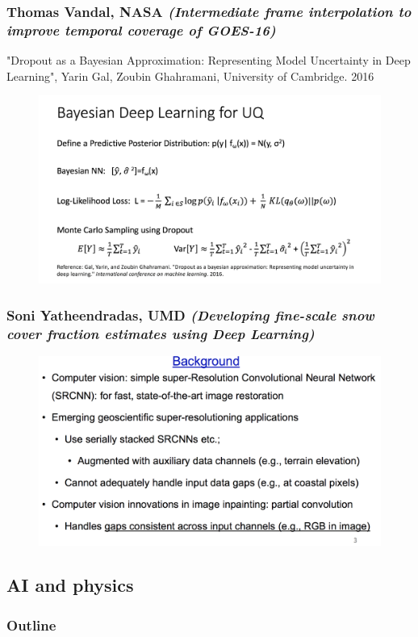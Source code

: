 \documentclass{beamer}
\begin{document}
\begin{frame}
\frametitle{Thomas Vandal, NASA \textit{(Intermediate frame interpolation to improve temporal coverage of GOES-16)}}
"Dropout as a Bayesian Approximation:
Representing Model Uncertainty in Deep Learning", Yarin Gal, Zoubin Ghahramani, University of Cambridge. 2016

\begin{figure}
	\includegraphics[width=.8\linewidth]{figs/ScreenShot_UQ.png}
\end{figure}
\end{frame}

\begin{frame}
\frametitle{Soni Yatheendradas, UMD \textit{(Developing fine-scale snow cover fraction
estimates using Deep Learning)}}
\begin{figure}
	\includegraphics[width=.8\linewidth]{figs/ScreenShot_snowfraction.png}
\end{figure}
\end{frame}


\subsection{AI and physics}

\begin{frame}
\frametitle{Outline} %
\tableofcontents[currentsection] %
\end{frame}
\end{document}

